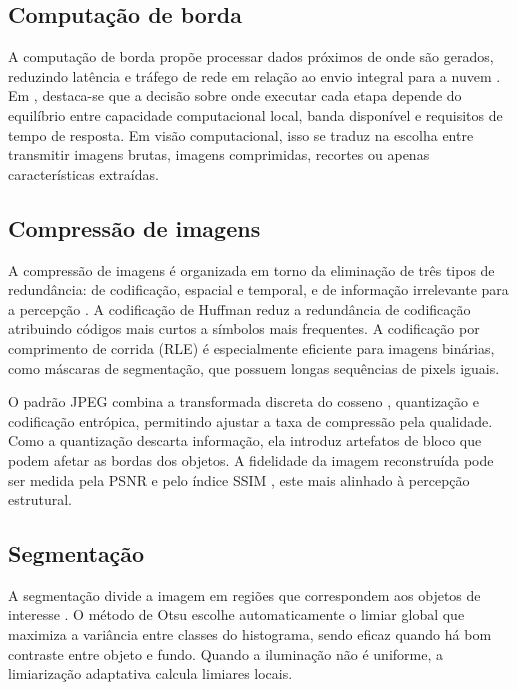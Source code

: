 \documentclass[12pt]{article}
\begin{document}
\subsection{Computação de borda}

A computação de borda propõe processar dados próximos de onde são gerados, reduzindo latência e tráfego de rede em relação ao envio integral para a nuvem \cite{shi2016}. Em \cite{satyanarayanan2017}, destaca-se que a decisão sobre onde executar cada etapa depende do equilíbrio entre capacidade computacional local, banda disponível e requisitos de tempo de resposta. Em visão computacional, isso se traduz na escolha entre transmitir imagens brutas, imagens comprimidas, recortes ou apenas características extraídas.

\subsection{Compressão de imagens}

A compressão de imagens é organizada em torno da eliminação de três tipos de redundância: de codificação, espacial e temporal, e de informação irrelevante para a percepção \cite{gonzalez2018}. A codificação de Huffman \cite{huffman1952} reduz a redundância de codificação atribuindo códigos mais curtos a símbolos mais frequentes. A codificação por comprimento de corrida (RLE) é especialmente eficiente para imagens binárias, como máscaras de segmentação, que possuem longas sequências de pixels iguais.

O padrão JPEG \cite{wallace1992} combina a transformada discreta do cosseno \cite{ahmed1974}, quantização e codificação entrópica, permitindo ajustar a taxa de compressão pela qualidade. Como a quantização descarta informação, ela introduz artefatos de bloco que podem afetar as bordas dos objetos. A fidelidade da imagem reconstruída pode ser medida pela PSNR e pelo índice SSIM \cite{wang2004}, este mais alinhado à percepção estrutural.

\subsection{Segmentação}

A segmentação divide a imagem em regiões que correspondem aos objetos de interesse \cite{gonzalez2018}. O método de Otsu \cite{otsu1979} escolhe automaticamente o limiar global que maximiza a variância entre classes do histograma, sendo eficaz quando há bom contraste entre objeto e fundo. Quando a iluminação não é uniforme, a limiarização adaptativa calcula limiares locais.
\end{document}
